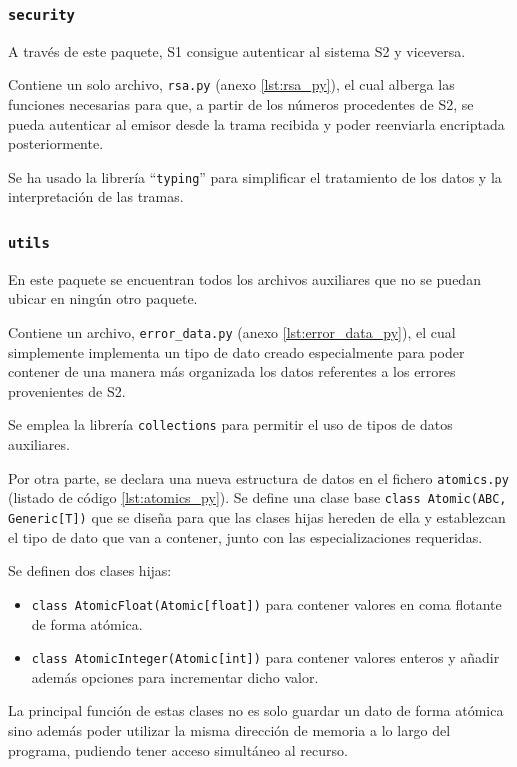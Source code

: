 \subsubsection{\texttt{security}}

A través de este paquete, \ac{S1} consigue autenticar al sistema \ac{S2} y viceversa.

Contiene un solo archivo, \texttt{rsa.py} (anexo \ref{lst:rsa_py}), el cual alberga las funciones necesarias para que, a partir de los números procedentes de \ac{S2}, se pueda autenticar al emisor desde la trama recibida y poder reenviarla encriptada posteriormente.

Se ha usado la librería ``\texttt{typing}'' para simplificar el tratamiento de los datos y la interpretación de las tramas.

\subsubsection{\texttt{utils}}

En este paquete se encuentran todos los archivos auxiliares que no se puedan ubicar en ningún otro paquete.

Contiene un archivo, \texttt{error\_data.py} (anexo \ref{lst:error_data_py}), el cual simplemente implementa un tipo de dato creado especialmente para poder contener de una manera más organizada los datos referentes a los errores provenientes de \ac{S2}.

Se emplea la librería \texttt{collections} para permitir el uso de tipos de datos auxiliares.

Por otra parte, se declara una nueva estructura de datos en el fichero \texttt{atomics.py}
(listado de código \ref{lst:atomics_py}). Se define una clase base 
\lstinline[style=Python]!class Atomic(ABC, Generic[T])! que se diseña para que las clases
hijas hereden de ella y establezcan el tipo de dato que van a contener, junto con
las especializaciones requeridas.

Se definen dos clases hijas:
\begin{itemize}
    \item \lstinline[style=Python]!class AtomicFloat(Atomic[float])! para contener
    valores en coma flotante de forma atómica.
    \item \lstinline[style=Python]!class AtomicInteger(Atomic[int])! para contener
    valores enteros y añadir además opciones para incrementar dicho valor.
\end{itemize}

La principal función de estas clases no es solo guardar un dato de forma atómica
sino además poder utilizar la misma dirección de memoria a lo largo del programa,
pudiendo tener acceso simultáneo al recurso.